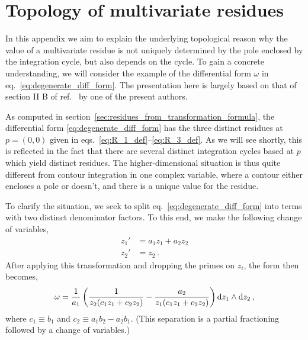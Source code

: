 \documentclass[dvipsnames,preprint,12pt,sort&compress]{elsarticle}
\def\d{{\rm d}}
\begin{document}
\appendix

\section{Topology of multivariate residues}\label{sec:topology_of_multivariate_residues}

In this appendix we aim to explain the underlying topological reason
why the value of a multivariate residue is not uniquely determined
by the pole enclosed by the integration cycle, but also depends on the cycle.
To gain a concrete understanding, we will consider the example of
the differential form $\omega$ in eq.~\eqref{eq:degenerate_diff_form}.
The presentation here is largely based on that of section II B of
ref.~\cite{Johansson:2015ava} by one of the present authors.

As computed in section~\ref{sec:residues_from_transformation_formula},
the differential form \eqref{eq:degenerate_diff_form} has the three distinct residues at
$p=(0,0)$ given in eqs.~\eqref{eq:R_1_def}--\eqref{eq:R_3_def}. As we will
see shortly, this is reflected in the fact that there are several
distinct integration cycles based at $p$ which yield distinct residues.
The higher-dimensional situation is thus quite different from contour integration
in one complex variable, where a contour either encloses a pole or doesn't,
and there is a unique value for the residue.

To clarify the situation, we seek to split eq.~\eqref{eq:degenerate_diff_form}
into terms with two distinct denominator factors. To this end, we
make the following change of variables,
\begin{equation}
\begin{aligned}
z_1' &= a_1 z_1 + a_2 z_2 \\
z_2' &= z_2 \,.
\end{aligned}
\end{equation}
After applying this transformation and dropping the primes
on $z_i$, the form then becomes,
\begin{align}
\omega = \frac{1}{a_1}
\left(\frac{1}{z_2 (c_1 z_1 + c_2 z_2)} - \frac{a_2}{z_1 (c_1 z_1 + c_2 z_2)}\right)
\d z_1\wedge \d z_2\,,
\label{eq:omega_partial_fractioned}
\end{align}
where $c_1 \equiv b_1$ and $c_2 \equiv a_1 b_2 - a_2 b_1$.
(This separation is a partial fractioning  followed by a change of variables.)
\end{document}
